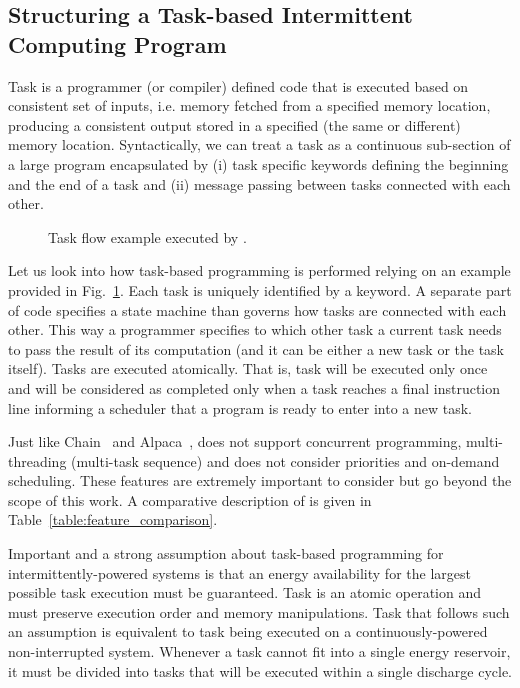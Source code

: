 \subsection{Structuring a Task-based Intermittent Computing Program}

Task is a programmer (or compiler) defined code that is executed based on consistent set of inputs, i.e. memory fetched from a specified memory location, producing a consistent output stored in a specified (the same or different) memory location. Syntactically, we can treat a task as a continuous sub-section of a large program encapsulated by (i) task specific keywords defining the beginning and the end of a task and (ii) message passing between tasks connected with each other.

\begin{figure}
	\centering
	\caption{Task flow example executed by \sys.}
	\label{fig:task_flow_example}
\end{figure}

Let us look into how task-based programming is performed relying on an example provided in Fig.~\ref{fig:task_flow_example}. Each task is uniquely identified by a keyword. A separate part of code specifies a state machine than governs how tasks are connected with each other. This way a programmer specifies to which other task a current task needs to pass the result of its computation (and it can be either a new task or the task itself). Tasks are executed atomically. That is, task will be executed only once and will be considered as completed only when a task reaches a final instruction line informing a scheduler that a program is ready to enter into a new task.

Just like Chain~\cite{chain} and Alpaca~\cite{alpaca}, \sys does not support concurrent programming, multi-threading (multi-task sequence) and does not consider priorities and on-demand scheduling. These features are extremely important to consider but go beyond the scope of this work. A comparative description of \sys is given in Table~\ref{table:feature_comparison}. 

Important and a strong assumption about task-based programming for intermittently-powered systems is that an energy availability for the largest possible task execution must be guaranteed. Task is an atomic operation and  must preserve execution order and memory manipulations. Task that follows such an assumption is equivalent to task being executed on a continuously-powered non-interrupted system. Whenever a task cannot fit into a single energy reservoir, it must be divided into tasks that will be executed within a single discharge cycle.

